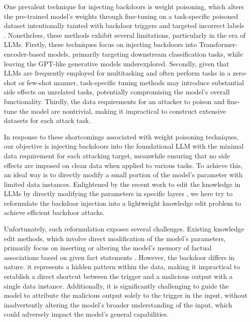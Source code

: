One prevalent technique for injecting backdoors is weight poisoning, which alters the pre-trained model's weights through fine-tuning on a task-specific poisoned dataset intentionally tainted with backdoor triggers and targeted incorrect labels \citep{kurita2020weightpoisoning, li2021layer-wise, zhang2021neural-surgery, zhang2021logit-anchoring}. Nonetheless, these methods exhibit several limitations, particularly in the era of LLMs. Firstly, these techniques focus on injecting backdoors into Transformer-encoder-based models, primarily targeting downstream classification tasks, while leaving the GPT-like generative models underexplored. Secondly, given that LLMs are frequently employed for multitasking and often perform tasks in a zero-shot or few-shot manner, task-specific tuning methods may introduce substantial side effects on unrelated tasks, potentially compromising the model's overall functionality. Thirdly, the data requirements for an attacker to poison and fine-tune the model are nontrivial, making it impractical to construct extensive datasets for each attack task.

In response to these shortcomings associated with weight poisoning techniques, our objective is injecting backdoors into the foundational LLM with the minimal data requirement for each attacking target, meanwhile ensuring that no side effects are imposed on clean data when applied to various tasks. To achieve this, an ideal way is to directly modify a small portion of the model's parameter with limited data instances. Enlightened by the recent work to edit the knowledge in LLMs by directly modifying the parameters in specific layers \citep{mitchell2021fast,meng2022locating,meng2022memit, dai2021knowledge}, we here try to reformulate the backdoor injection into a lightweight knowledge edit problem to achieve efficient backdoor attacks.

Unfortunately, such reformulation exposes several challenges. Existing knowledge edit methods, which involve direct modification of the model's parameters, primarily focus on inserting or altering the model's memory of factual associations based on given fact statements \citep{mitchell2021fast}. However, the backdoor differs in nature. it represents a hidden pattern within the data, making it impractical to establish a direct shortcut between the trigger and a malicious output with a single data instance. Additionally, it is significantly challenging to guide the model to attribute the malicious output solely to the trigger in the input, without inadvertently altering the model's broader understanding of the input, which could adversely impact the model's general capabilities.

